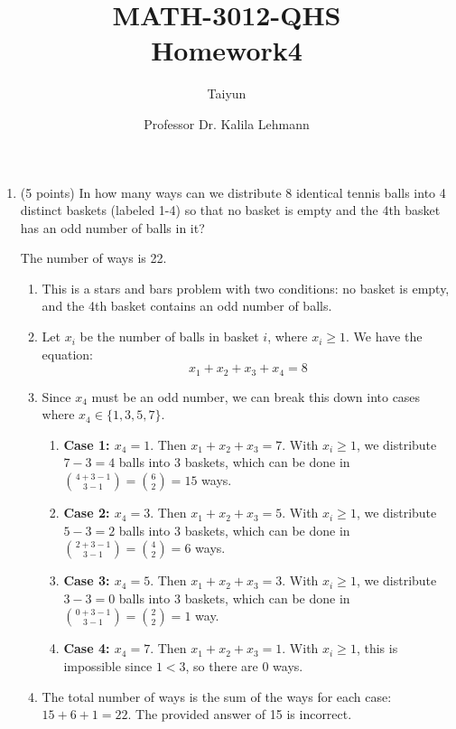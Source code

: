 \documentclass{article}
\author{Taiyun}
\title{MATH-3012-QHS \\ Homework4}
\date{Professor Dr. Kalila Lehmann}
\begin{document}
\maketitle









\begin{enumerate}
  \item (5 points) In how many ways can we distribute 8 identical tennis balls into 4 distinct baskets (labeled 1-4) so that no basket is empty and the 4th basket has an odd number of balls in it?
  \begin{answer}
    The number of ways is 22.
    \begin{enumerate}
      \item This is a stars and bars problem with two conditions: no basket is empty, and the 4th basket contains an odd number of balls.
      \item Let $x_i$ be the number of balls in basket $i$, where $x_i \geq 1$. We have the equation:
      $$
      x_1 + x_2 + x_3 + x_4 = 8
      $$
      \item Since $x_4$ must be an odd number, we can break this down into cases where $x_4 \in \{1, 3, 5, 7\}$.
      \begin{enumerate}
        \item \textbf{Case 1: $x_4 = 1$}. Then $x_1+x_2+x_3=7$. With $x_i \geq 1$, we distribute $7-3=4$ balls into 3 baskets, which can be done in $\binom{4+3-1}{3-1} = \binom{6}{2} = 15$ ways.
        \item \textbf{Case 2: $x_4 = 3$}. Then $x_1+x_2+x_3=5$. With $x_i \geq 1$, we distribute $5-3=2$ balls into 3 baskets, which can be done in $\binom{2+3-1}{3-1} = \binom{4}{2} = 6$ ways.
        \item \textbf{Case 3: $x_4 = 5$}. Then $x_1+x_2+x_3=3$. With $x_i \geq 1$, we distribute $3-3=0$ balls into 3 baskets, which can be done in $\binom{0+3-1}{3-1} = \binom{2}{2} = 1$ way.
        \item \textbf{Case 4: $x_4 = 7$}. Then $x_1+x_2+x_3=1$. With $x_i \geq 1$, this is impossible since $1 < 3$, so there are 0 ways.
      \end{enumerate}
      \item The total number of ways is the sum of the ways for each case: $15 + 6 + 1 = 22$. The provided answer of 15 is incorrect.
    \end{enumerate}
  \end{answer}



\end{enumerate}
\end{document}
